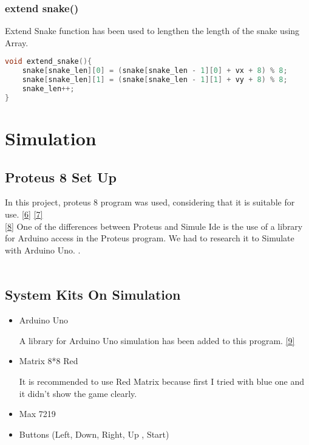 \documentclass[onecolumn]{article}
\begin{document}
\subsubsection{extend snake()}

Extend Snake function has been used to lengthen the length of the snake using Array.

\begin{lstlisting}[language=C, caption= Extend Snake]
void extend_snake(){
    snake[snake_len][0] = (snake[snake_len - 1][0] + vx + 8) % 8;
    snake[snake_len][1] = (snake[snake_len - 1][1] + vy + 8) % 8;
    snake_len++;
}
\end{lstlisting}



\section{Simulation}

\subsection{Proteus 8 Set Up}

In this project, proteus 8 program was used, considering that it is suitable for use. \href{https://www.youtube.com/watch?v=0mckp3UdVmc}{ {[6]}} \href{https://www.youtube.com/watch?v=1yl9lSKIXkM}{ {[7]}} 
\\\href{https://maker.pro/arduino/projects/how-to-simulate-arduino-projects-using-proteus}{ {[8]}} 
One of the differences between Proteus and Simule Ide is the use of a library for Arduino access in the Proteus program. We had to research it to Simulate with Arduino Uno.
.\\\\

\subsection{System Kits On Simulation}

\begin{itemize}
\item Arduino Uno

A library for Arduino Uno simulation has been added to this program. \href{https://youtu.be/eeRzhR1pfnY}{{[9]}} 

\item Matrix 8*8 Red

It is recommended to use Red Matrix because first I tried with blue one and it didn't show the game clearly.
\item Max 7219
\item Buttons (Left, Down, Right, Up , Start)
\end{itemize}
\end{document}
